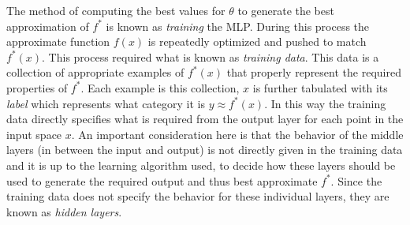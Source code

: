 \documentclass[12pt]{extarticle}
\numberwithin{equation}{section}
\begin{document}
	The method of computing the best values for $\theta$ to generate the best approximation of $f^*$ is known as \textit{training} the MLP. During this process the approximate function $f(x)$ is repeatedly optimized and pushed to match $f^*(x)$. This process required what is known as \textit{training data}. This data is a collection of appropriate examples of $f^*(x)$ that properly represent the required properties of $f^*$. Each example is this collection, $x$ is further tabulated with its \textit{label} which represents what category it is $y \approx f^*(x)$. In this way the training data directly specifies what is required from the output layer for each point in the input space $x$. An important consideration here is that the behavior of the middle layers (in between the input and output) is not directly given in the training data and it is up to the learning algorithm used, to decide how these layers should be used to generate the required output and thus best approximate $f^*$. Since the training data does not specify the behavior for these individual layers, they are known as \textit{hidden layers}.
	
\end{document}
